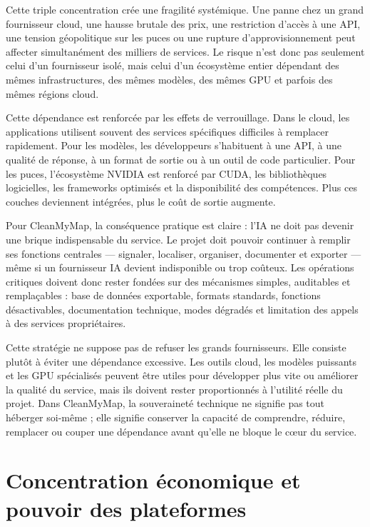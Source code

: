 \documentclass[
  10pt,
  a4paper,
  DIV=11,
  numbers=noendperiod,
  oneside]{scrreprt}
\begin{document}
Cette triple concentration crée une fragilité systémique. Une panne chez
un grand fournisseur cloud, une hausse brutale des prix, une restriction
d'accès à une API, une tension géopolitique sur les puces ou une rupture
d'approvisionnement peut affecter simultanément des milliers de
services. Le risque n'est donc pas seulement celui d'un fournisseur
isolé, mais celui d'un écosystème entier dépendant des mêmes
infrastructures, des mêmes modèles, des mêmes GPU et parfois des mêmes
régions cloud.

Cette dépendance est renforcée par les effets de verrouillage. Dans le
cloud, les applications utilisent souvent des services spécifiques
difficiles à remplacer rapidement. Pour les modèles, les développeurs
s'habituent à une API, à une qualité de réponse, à un format de sortie
ou à un outil de code particulier. Pour les puces, l'écosystème NVIDIA
est renforcé par CUDA, les bibliothèques logicielles, les frameworks
optimisés et la disponibilité des compétences. Plus ces couches
deviennent intégrées, plus le coût de sortie augmente.

Pour CleanMyMap, la conséquence pratique est claire : l'IA ne doit pas
devenir une brique indispensable du service. Le projet doit pouvoir
continuer à remplir ses fonctions centrales --- signaler, localiser,
organiser, documenter et exporter --- même si un fournisseur IA devient
indisponible ou trop coûteux. Les opérations critiques doivent donc
rester fondées sur des mécanismes simples, auditables et remplaçables :
base de données exportable, formats standards, fonctions désactivables,
documentation technique, modes dégradés et limitation des appels à des
services propriétaires.

Cette stratégie ne suppose pas de refuser les grands fournisseurs. Elle
consiste plutôt à éviter une dépendance excessive. Les outils cloud, les
modèles puissants et les GPU spécialisés peuvent être utiles pour
développer plus vite ou améliorer la qualité du service, mais ils
doivent rester proportionnés à l'utilité réelle du projet. Dans
CleanMyMap, la souveraineté technique ne signifie pas tout héberger
soi-même ; elle signifie conserver la capacité de comprendre, réduire,
remplacer ou couper une dépendance avant qu'elle ne bloque le cœur du
service.

\section{Concentration économique et pouvoir des
plateformes}\label{concentration-uxe9conomique-et-pouvoir-des-plateformes}
\end{document}

